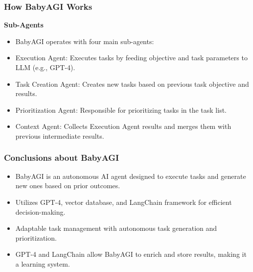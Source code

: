 \begin{frame}[fragile]
\frametitle{How BabyAGI Works}

\textbf{Sub-Agents}
\begin{itemize}
    \item BabyAGI operates with four main sub-agents:
    \item Execution Agent: Executes tasks by feeding objective and task parameters to LLM (e.g., GPT-4).
    \item Task Creation Agent: Creates new tasks based on previous task objective and results.
    \item Prioritization Agent: Responsible for prioritizing tasks in the task list.
    \item Context Agent: Collects Execution Agent results and merges them with previous intermediate results.
\end{itemize}

\end{frame}

\begin{frame}[fragile]
\frametitle{Conclusions about BabyAGI}

\begin{itemize}
    \item BabyAGI is an autonomous AI agent designed to execute tasks and generate new ones based on prior outcomes.
    \item Utilizes GPT-4, vector database, and LangChain framework for efficient decision-making.
    \item Adaptable task management with autonomous task generation and prioritization.
    \item GPT-4 and LangChain allow BabyAGI to enrich and store results, making it a learning system.
\end{itemize}

\end{frame}

